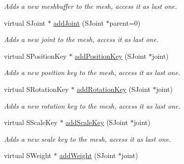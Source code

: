 \begin{DoxyCompactItemize}
\begin{DoxyCompactList}\small\item\em Adds a new meshbuffer to the mesh, access it as last one. \end{DoxyCompactList}\item 
\hypertarget{classirr_1_1scene_1_1_c_skinned_mesh_adc2d46c126a5fe98677565b4df065583}{virtual S\-Joint $\ast$ \hyperlink{classirr_1_1scene_1_1_c_skinned_mesh_adc2d46c126a5fe98677565b4df065583}{add\-Joint} (S\-Joint $\ast$parent=0)}\label{classirr_1_1scene_1_1_c_skinned_mesh_adc2d46c126a5fe98677565b4df065583}

\begin{DoxyCompactList}\small\item\em Adds a new joint to the mesh, access it as last one. \end{DoxyCompactList}\item 
\hypertarget{classirr_1_1scene_1_1_c_skinned_mesh_ae8a450d6fed0d64f791f2b5a03a446a6}{virtual S\-Position\-Key $\ast$ \hyperlink{classirr_1_1scene_1_1_c_skinned_mesh_ae8a450d6fed0d64f791f2b5a03a446a6}{add\-Position\-Key} (S\-Joint $\ast$joint)}\label{classirr_1_1scene_1_1_c_skinned_mesh_ae8a450d6fed0d64f791f2b5a03a446a6}

\begin{DoxyCompactList}\small\item\em Adds a new position key to the mesh, access it as last one. \end{DoxyCompactList}\item 
\hypertarget{classirr_1_1scene_1_1_c_skinned_mesh_af48dac6dbedcd45c6d6e0b0eddc2ed7f}{virtual S\-Rotation\-Key $\ast$ \hyperlink{classirr_1_1scene_1_1_c_skinned_mesh_af48dac6dbedcd45c6d6e0b0eddc2ed7f}{add\-Rotation\-Key} (S\-Joint $\ast$joint)}\label{classirr_1_1scene_1_1_c_skinned_mesh_af48dac6dbedcd45c6d6e0b0eddc2ed7f}

\begin{DoxyCompactList}\small\item\em Adds a new rotation key to the mesh, access it as last one. \end{DoxyCompactList}\item 
\hypertarget{classirr_1_1scene_1_1_c_skinned_mesh_a2697244d4e9c15f4bab3458a0e1a1027}{virtual S\-Scale\-Key $\ast$ \hyperlink{classirr_1_1scene_1_1_c_skinned_mesh_a2697244d4e9c15f4bab3458a0e1a1027}{add\-Scale\-Key} (S\-Joint $\ast$joint)}\label{classirr_1_1scene_1_1_c_skinned_mesh_a2697244d4e9c15f4bab3458a0e1a1027}

\begin{DoxyCompactList}\small\item\em Adds a new scale key to the mesh, access it as last one. \end{DoxyCompactList}\item 
\hypertarget{classirr_1_1scene_1_1_c_skinned_mesh_abc4eab31c6ffff9a3217f7904edf825e}{virtual S\-Weight $\ast$ \hyperlink{classirr_1_1scene_1_1_c_skinned_mesh_abc4eab31c6ffff9a3217f7904edf825e}{add\-Weight} (S\-Joint $\ast$joint)}\label{classirr_1_1scene_1_1_c_skinned_mesh_abc4eab31c6ffff9a3217f7904edf825e}


\end{DoxyCompactItemize}
